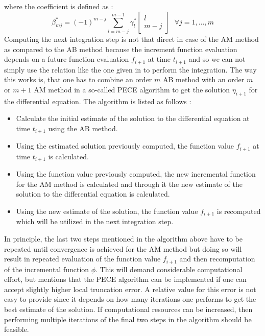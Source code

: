 %
where the coefficient is defined as \cite{gillbook}:
\begin{equation}
\label{beta_ab}
\beta_{mj}^* = (-1)^{m-j} \sum_{l=m-j}^{m-1} \gamma_l^*
\begin{bmatrix}
l\\
m-j
\end{bmatrix}
\text{  } \forall j=1,...,m
\end{equation}
%
Computing the next integration step is not that direct in case of the \gls{AM} method as compared to the \gls{AB} method because the increment function evaluation depends on a future function evaluation $f_{i+1}$ at time $t_{i+1}$ and so we can not simply use the relation like the one given in  to perform the integration. The way this works is, that one has to combine an order $m$ \gls{AB} method with an order $m$ or $m+1$ \gls{AM} method in a so-called \gls{PECE} algorithm to get the solution $\eta_{i+1}$ for the differential equation. The algorithm is listed as follows \cite{gillbook}:
\begin{itemize}
\item Calculate the initial estimate of the solution to the differential equation at time $t_{i+1}$ using the \gls{AB} method.
\item Using the estimated solution previously computed, the function value $f_{i+1}$ at time $t_{i+1}$ is calculated.
\item Using the function value previously computed, the new incremental function for the \gls{AM} method is calculated and through it the new estimate of the solution to the differential equation is calculated.
\item Using the new estimate of the solution, the function value $f_{i+1}$ is recomputed which will be utilized in the next integration step.
\end{itemize}
%
In principle, the last two steps mentioned in the algorithm above have to be repeated until convergence is achieved for the \gls{AM} method but doing so will result in repeated evaluation of the function value $f_{i+1}$ and then recomputation of the incremental function $\phi$. This will demand considerable computational effort, but \cite{gillbook} mentions that the \gls{PECE} algorithm can be implemented if one can accept slightly higher local truncation error. A relative value for this error is not easy to provide since it depends on how many iterations one performs to get the best estimate of the solution. If computational resources can be increased, then performing multiple iterations of the final two steps in the algorithm should be feasible.


